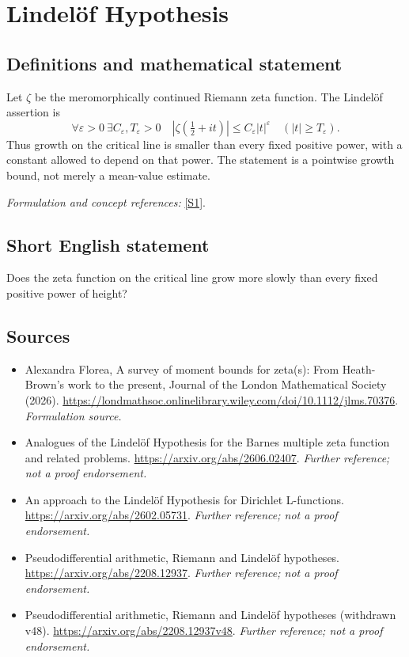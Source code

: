 \documentclass[11pt]{article}
\begin{document}
\section*{\texorpdfstring{Lindelöf Hypothesis}{Lindelöf Hypothesis}}\label{statement}
\subsection{Definitions and mathematical statement}
Let $\zeta$ be the meromorphically continued Riemann zeta function. The Lindelöf assertion is
\[
 \forall\varepsilon>0\ \exists C_\varepsilon,T_\varepsilon>0\quad
 |\zeta(\tfrac12+it)|\le C_\varepsilon|t|^\varepsilon
 \quad(|t|\ge T_\varepsilon).
\]
Thus growth on the critical line is smaller than every fixed positive power, with a constant allowed to depend on that power. The statement is a pointwise growth bound, not merely a mean-value estimate.
\par\smallskip\textit{Formulation and concept references:} \href{https://londmathsoc.onlinelibrary.wiley.com/doi/10.1112/jlms.70376}{[S1]}.

\subsection{Short English statement}
Does the zeta function on the critical line grow more slowly than every fixed positive power of height?
\subsection{Sources}
\begin{itemize}
\item[S1]Alexandra Florea, A survey of moment bounds for zeta(s): From Heath-Brown's work to the present, Journal of the London Mathematical Society (2026).
\url{https://londmathsoc.onlinelibrary.wiley.com/doi/10.1112/jlms.70376}.
\textit{Formulation source.}
\item[S2]Analogues of the Lindelöf Hypothesis for the Barnes multiple zeta function and related problems.
\url{https://arxiv.org/abs/2606.02407}.
\textit{Further reference; not a proof endorsement.}
\item[S3]An approach to the Lindelöf Hypothesis for Dirichlet L-functions.
\url{https://arxiv.org/abs/2602.05731}.
\textit{Further reference; not a proof endorsement.}
\item[S4]Pseudodifferential arithmetic, Riemann and Lindelöf hypotheses.
\url{https://arxiv.org/abs/2208.12937}.
\textit{Further reference; not a proof endorsement.}
\item[S5]Pseudodifferential arithmetic, Riemann and Lindelöf hypotheses (withdrawn v48).
\url{https://arxiv.org/abs/2208.12937v48}.
\textit{Further reference; not a proof endorsement.}
\end{itemize}
\end{document}
